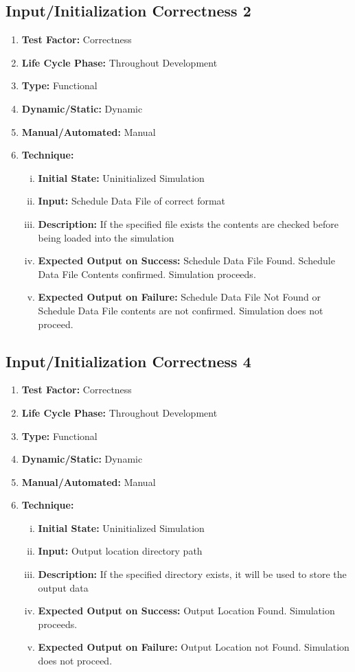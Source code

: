 \documentclass[paper=letter, fontsize=10pt]{scrartcl}
\numberwithin{equation}{section}		%
\numberwithin{figure}{section}			%
\numberwithin{table}{section}				%
\begin{document}
\subsection{Input/Initialization Correctness 2}
\begin{enumerate}[]
	\item \textbf{Test Factor:} Correctness  
	\item \textbf{Life Cycle Phase:} Throughout Development
	\item \textbf{Type:} Functional
	\item \textbf{Dynamic/Static:} Dynamic
	\item \textbf{Manual/Automated:} Manual
	\item \textbf{Technique:}
		\begin{enumerate}[(i)]
			\item \textbf{Initial State:} Uninitialized Simulation   
			\item \textbf{Input:} Schedule Data File of correct format
			\item \textbf{Description:} If the specified file exists the contents are checked before being loaded into the simulation
			\item \textbf{Expected Output on Success:} Schedule Data File Found. Schedule Data File Contents confirmed. Simulation proceeds.
			\item \textbf{Expected Output on Failure:} Schedule Data File Not Found or Schedule Data File contents are not confirmed. Simulation does not proceed.
		\end{enumerate}
\end{enumerate}

\subsection{Input/Initialization Correctness 4}
\begin{enumerate}[]
	\item \textbf{Test Factor:} Correctness  
	\item \textbf{Life Cycle Phase:} Throughout Development
	\item \textbf{Type:} Functional
	\item \textbf{Dynamic/Static:} Dynamic
	\item \textbf{Manual/Automated:} Manual
	\item \textbf{Technique:}
		\begin{enumerate}[(i)]
			\item \textbf{Initial State:} Uninitialized Simulation   
			\item \textbf{Input:} Output location directory path
			\item \textbf{Description:} If the specified directory exists, it will be used to store the output data
			\item \textbf{Expected Output on Success:} Output Location Found. Simulation proceeds.
			\item \textbf{Expected Output on Failure:} Output Location not Found. Simulation does not proceed.
		\end{enumerate}
\end{enumerate}
\end{document}
